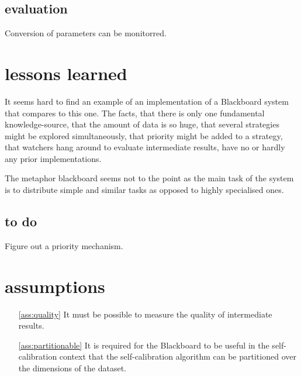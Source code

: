 \documentclass[]{lofar}
\begin{document}
    \subsection{evaluation}
    \label{subsec:evaluation}\hypertarget{subsec:evaluation}{}

      Conversion of parameters can be monitorred.

  \section{lessons learned}
  \label{sec:lessons-learned}

    It seems hard to find an example of an implementation of a
    Blackboard system that compares to this one. The facts, that there
    is only one fundamental knowledge-source, that the amount of data
    is so huge, that several strategies might be explored
    simultaneously, that priority might be added to a strategy, that
    watchers hang around to evaluate intermediate results, have no or
    hardly any prior implementations.

    The metaphor blackboard seems not to the point as the main task of
    the system is to distribute simple and similar tasks as opposed to
    highly specialised ones.

    \subsection{to do}

      Figure out a priority mechanism.

\newcommand{\dbappendix}[1]{\section{#1}}
\appendix
  \dbappendix{assumptions}
  \label{app:assumptions}\hypertarget{app:assumptions}{}
    \begin{itemize}
      \item [\ref{ass:quality}]It must be possible to measure the
        quality of intermediate results.
      \item [\ref{ass:partitionable}]It is required for the Blackboard
        to be useful in the self-calibration context that the
        self-calibration algorithm can be partitioned over the
        dimensions of the dataset.
    \end{itemize}
\end{document}
